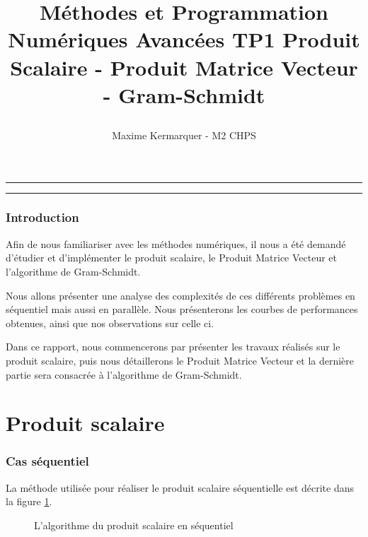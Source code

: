 \documentclass[a4paper]{article}
\title{
    \begin{minipage}\linewidth
        \centering\bfseries\sffamily
        Méthodes et Programmation Numériques Avancées
        \vskip10pt
        \large TP1
         \vskip10pt
         \large Produit Scalaire - Produit Matrice Vecteur - Gram-Schmidt
    \end{minipage}}
\author{Maxime Kermarquer - M2 CHPS}
\date{}
\begin{document}
\maketitle

\vskip 1cm
\hrule
\medskip
  \tableofcontents
\medskip
\hrule
\vskip 1.5cm

\section*{Introduction}
Afin de nous familiariser avec les méthodes numériques, il nous a été demandé d'étudier et d'implémenter le produit scalaire, le Produit Matrice Vecteur et l'algorithme de Gram-Schmidt.

Nous allons présenter une analyse des complexités de ces différents problèmes en séquentiel mais aussi en parallèle. Nous présenterons les courbes de performances obtenues, ainsi que nos observations sur celle ci.

Dans ce rapport, nous commencerons par présenter les travaux réalisés sur le produit scalaire, puis nous détaillerons le Produit Matrice Vecteur et la dernière partie sera consacrée à l'algorithme de Gram-Schmidt.

\newpage


\part{Produit scalaire}

\section{Cas séquentiel}



La méthode utilisée pour réaliser le produit scalaire séquentielle est décrite dans la figure \ref{fig:algo_ps}.

\begin{figure}[h]
	\caption{L'algorithme du produit scalaire en séquentiel}%
	\label{fig:algo_ps}%
\end{figure}
\end{document}
